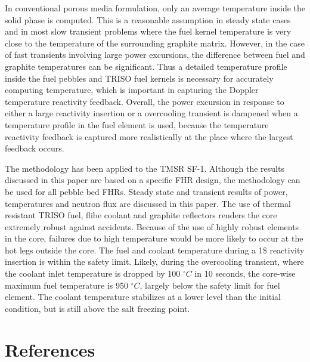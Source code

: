 \documentclass{elsarticle}
\begin{document}
In conventional porous media formulation, only an average temperature inside the solid phase is computed. This is a reasonable assumption in steady state cases and in most slow transient problems where the fuel kernel temperature is very close to the temperature of the surrounding graphite matrix. However, in the case of fast transients involving large power excursions, the difference between fuel and graphite temperatures can be significant. Thus a detailed temperature profile inside the fuel pebbles and TRISO fuel kernels is necessary for accurately computing temperature, which is important in capturing the Doppler temperature reactivity feedback.
Overall, the power excursion in response to either a large reactivity insertion or a overcooling transient is dampened when a temperature profile in the fuel element is used, because the temperature reactivity feedback is captured more realistically at the place where the largest feedback occurs.

The methodology has been applied to the TMSR SF-1. 
Although the results discussed in this paper are based on a specific FHR design, the methodology can be used for all pebble bed FHRs.
Steady state and transient results of power, temperatures and neutron flux are discussed in this paper. The use of thermal resistant TRISO fuel, flibe coolant and graphite reflectors renders the core extremely robust against accidents. 
Because of the use of highly robust elements in the core, failures due to high temperature would be more likely to occur at the hot legs outside the core.
The fuel and coolant temperature during a 1\$ reactivity insertion is within the safety limit.
Likely, during the overcooling transient, where the coolant inlet temperature is dropped by 100 $^{\circ}C$ in 10 seconds, the core-wise maximum fuel temperature is 950 $^{\circ}C$, largely below the safety limit for fuel element. The coolant temperature stabilizes at a lower level than the initial condition, but is still above the salt freezing point.



\section*{References}


\end{document}
